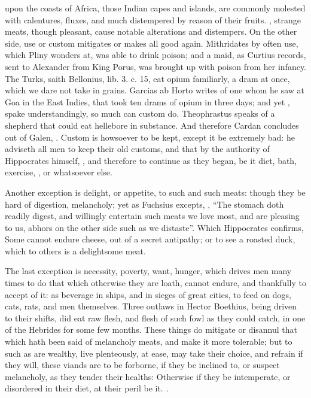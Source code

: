 upon the coasts of Africa, those Indian capes and islands, are commonly
molested with calentures, fluxes, and much distempered by reason of their
fruits. , strange meats, though pleasant, cause notable
alterations and distempers. On the other side, use or custom mitigates or makes
all good again. Mithridates by often use, which Pliny wonders at, was able to
drink poison; and a maid, as Curtius records, sent to Alexander from King
Porus, was brought up with poison from her infancy. The Turks, saith Bellonius,
lib. 3. c. 15, eat opium familiarly, a dram at once, which we dare not take in
grains. Garcias ab Horto writes of one whom he saw at Goa
in the East Indies, that took ten drams of opium in three days; and yet
, spake understandingly, so much can custom do.
Theophrastus speaks of a shepherd that could eat hellebore
in substance. And therefore Cardan concludes out of Galen, . Custom is howsoever to be kept, except it
be extremely bad: he adviseth all men to keep their old customs, and that by
the authority of Hippocrates himself, , and therefore to
continue as they began, be it diet, bath, exercise,
\etc{}, or whatsoever else.

Another exception is delight, or appetite, to such and such meats: though they
be hard of digestion, melancholy; yet as Fuchsius excepts,
,
\enquote{The stomach doth readily digest, and willingly entertain
such meats we love most, and are pleasing to us, abhors on the other side such
as we distaste}. Which Hippocrates confirms,  Some cannot endure cheese, out of a secret antipathy; or to see a roasted
duck, which to others is a delightsome meat.

The last exception is necessity, poverty, want, hunger, which drives men many
times to do that which otherwise they are loath, cannot endure, and thankfully
to accept of it: as beverage in ships, and in sieges of great cities, to feed
on dogs, cats, rats, and men themselves. Three outlaws in
Hector Boethius, being driven to their shifts, did eat raw
flesh, and flesh of such fowl as they could catch, in one of the Hebrides for
some few months. These things do mitigate or disannul that which hath been said
of melancholy meats, and make it more tolerable; but to such as are wealthy,
live plenteously, at ease, may take their choice, and refrain if they will,
these viands are to be forborne, if they be inclined to, or suspect melancholy,
as they tender their healths: Otherwise if they be intemperate, or disordered
in their diet, at their peril be it. .


